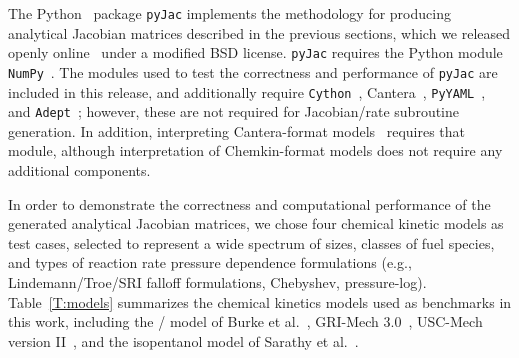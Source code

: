 \documentclass[preprint,12pt]{elsarticle}
\begin{document}
{The Python~\cite{Python:2015} package \texttt{pyJac} implements the methodology for producing analytical Jacobian matrices described in the previous sections, which we released openly online~\cite{Niemeyer:2015im} under a modified BSD license.
\texttt{pyJac} requires the Python module \texttt{NumPy}~\cite{Walt:2011aa}.
The modules used to test the correctness and performance of \texttt{pyJac} are included in this release, and additionally require \texttt{Cython}~\cite{Behnel:2011aa}, Cantera~\cite{Goodwin:2015aa}, \texttt{PyYAML}~\cite{Simonov:2014aa}, and \texttt{Adept}~\cite{adept-v11}; however, these are not required for Jacobian\slash rate subroutine generation.
In addition, interpreting Cantera-format models~\cite{Goodwin:2015aa} requires that module, although interpretation of Chemkin-format models does not require any additional components.

In order to demonstrate the correctness and computational performance of the generated analytical Jacobian matrices, we chose four chemical kinetic models as test cases, selected to represent a wide spectrum of sizes, classes of fuel species, and types of reaction rate pressure dependence formulations (e.g., Lindemann\slash Troe\slash SRI falloff formulations, Chebyshev, pressure-log).
Table~\ref{T:models} summarizes the chemical kinetics models used as benchmarks in this work, including the \slash {} model of Burke et al.~\cite{Burke:2011fh}, GRI-Mech 3.0~\cite{smith_gri-mech_30}, USC-Mech version II~\cite{Wang:2007}, and the isopentanol model of Sarathy et al.~\cite{Sarathy:2013jr}.

}
\end{document}
